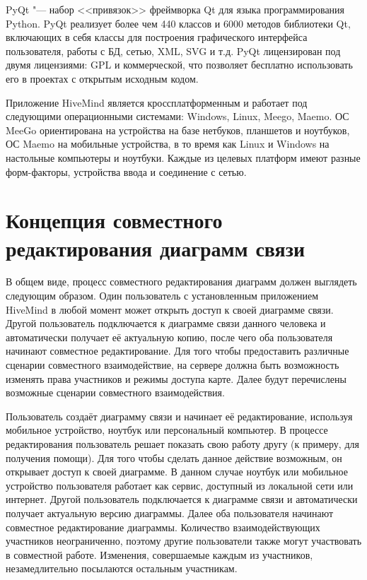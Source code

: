 PyQt "--- набор <<привязок>> фреймворка Qt для языка программирования Python.
PyQt реализует более чем 440 классов и 6000 методов библиотеки Qt, включающих в
себя классы для построения графического интерфейса пользователя, работы с БД,
сетью, XML, SVG и т.д. PyQt лицензирован под двумя лицензиями: GPL и
коммерческой, что позволяет бесплатно использовать его в проектах с открытым
исходным кодом.

Приложение HiveMind является кроссплатформенным и работает под следующими
операционными системами: Windows, Linux, Meego, Maemo. ОС MeeGo ориентирована на
устройства на базе нетбуков, планшетов и ноутбуков, ОС Maemo на мобильные
устройства, в то время как Linux и Windows на настольные компьютеры и ноутбуки.
Каждые из целевых платформ имеют разные форм-факторы, устройства ввода и
соединение с сетью.


\section{Концепция совместного редактирования диаграмм связи}
\label{sec:collaborative_mindmapping}
В общем виде, процесс совместного редактирования диаграмм должен выглядеть
следующим образом. Один пользователь с установленным приложением HiveMind в
любой момент может открыть доступ к своей диаграмме связи. Другой пользователь
подключается к диаграмме связи данного человека и автоматически получает её
актуальную копию, после чего оба пользователя начинают совместное
редактирование. Для того чтобы предоставить различные сценарии
совместного взаимодействие, на сервере должна быть возможность изменять права
участников и режимы доступа карте. Далее будут перечислены возможные сценарии
совместного взаимодействия.

Пользователь создаёт диаграмму связи и начинает её редактирование, используя
мобильное устройство, ноутбук или персональный компьютер. В процессе
редактирования пользователь решает показать свою работу другу (к примеру, для
получения помощи). Для того чтобы сделать данное действие возможным, он
открывает доступ к своей диаграмме. В данном случае ноутбук или мобильное
устройство пользователя работает как сервис, доступный из локальной сети или
интернет. Другой пользователь подключается к диаграмме связи и автоматически
получает актуальную версию диаграммы. Далее оба пользователя начинают совместное
редактирование диаграммы. Количество взаимодействующих участников неограниченно,
поэтому другие пользователи также могут участвовать в совместной работе.
Изменения, совершаемые каждым из участников, незамедлительно посылаются
остальным участникам.

